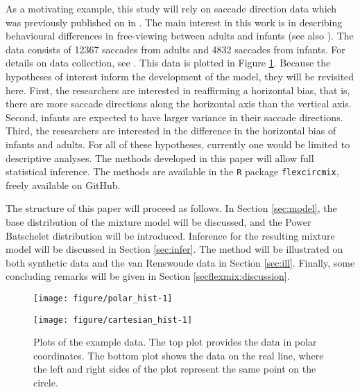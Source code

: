 As a motivating example, this study will rely on saccade direction data which was previously published on in \citet{van2016infants}. The main interest in this work is in describing behavioural differences in free-viewing between adults and infants (see also \citet{aslin2007s}). The data consists of 12367  saccades from adults and 4832 saccades from infants. For details on data collection, see \citet{van2016infants}. This data is plotted in Figure \ref{scd_ex}. Because the hypotheses of interest inform the development of the model, they will be revisited here. First, the researchers are interested in reaffirming a horizontal bias, that is, there are more saccade directions along the horizontal axis than the vertical axis. Second, infants are expected to have larger variance in their saccade directions. Third, the researchers are interested in the difference in the horizontal bias of infants and adults. For all of these hypotheses, currently one would be limited to descriptive analyses. The methods developed in this paper will allow full statistical inference. The methods are available in the \texttt{R} package \texttt{flexcircmix}, freely available on GitHub.

The structure of this paper will proceed as follows. In Section \ref{sec:model}, the base distribution of the mixture model will be discussed, and the Power Batschelet distribution will be introduced. Inference for the resulting mixture model will be discussed in Section \ref{sec:infer}. The method will be illustrated on both synthetic data and the van Renswoude data in Section \ref{sec:ill}. Finally, some concluding remarks will be given in Section \ref{secflexmix:discussion}.






\begin{figure}
\centering
\begin{knitrout}
\color{fgcolor}
\texttt{[image: figure/polar\_hist-1]} 

\end{knitrout}
\centering \vspace{-1.5cm}
\begin{knitrout}
\color{fgcolor}
\texttt{[image: figure/cartesian\_hist-1]} 

\end{knitrout}
\caption{Plots of the example data. The top plot provides the data in polar coordinates. The bottom plot shows the data on the real line, where the left and right sides of the plot represent the same point on the circle.}
\label{scd_ex}
\end{figure}

